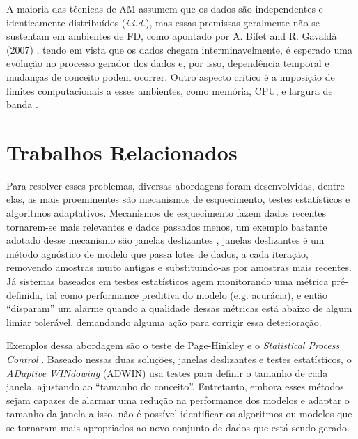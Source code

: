 A maioria das técnicas de AM assumem que os dados são independentes e
identicamente distribuídos (\textit{i.i.d.}), mas essas premissas geralmente não
se sustentam em ambientes de FD, como apontado por A. Bifet and R.
Gavald\`a (2007) \cite{bifet2007learning}, tendo em vista que os dados chegam
interminavelmente, é esperado uma evolução no processo gerador dos dados e, por isso, dependência temporal e mudanças de conceito podem ocorrer.  Outro aspecto critico é a imposição de limites
computacionais a esses ambientes, como memória, CPU, e largura de banda
\cite{bifet2010moa, gama2012survey}.

\section{Trabalhos Relacionados}

Para resolver esses problemas, diversas
abordagens foram desenvolvidas, dentre elas, as mais proeminentes são
mecanismos de esquecimento, testes estatísticos e algoritmos adaptativos.
Mecanismos de esquecimento fazem dados recentes tornarem-se mais relevantes e
dados passados menos, um exemplo bastante adotado desse mecanismo são janelas deslizantes
\cite{gaber2005mining}, janelas deslizantes é um método agnóstico de modelo que passa lotes de dados, a cada iteração, removendo amostras muito antigas e substituindo-as por amostras mais recentes. Já sistemas baseados em testes estatísticos agem monitorando uma métrica
pré-definida, tal como performance preditiva do modelo (e.g. acurácia), e então ``disparam'' um
alarme quando a qualidade dessas métricas está abaixo de algum limiar
tolerável, demandando alguma ação para corrigir essa deterioração.

Exemplos dessa abordagem são o teste de Page-Hinkley e o \textit{Statistical
Process Control} \cite{gama2010knowledge}.
Baseado nessas duas soluções, janelas deslizantes e testes estatísticos, o \textit{ADaptive WINdowing} (ADWIN) \cite{bifet2007learning} usa testes para definir o tamanho de cada janela, ajustando ao ``tamanho do conceito''.
Entretanto, embora esses métodos sejam capazes de alarmar uma redução na performance dos modelos e adaptar o tamanho da janela a isso, não é possível identificar os algoritmos ou modelos que se tornaram mais apropriados ao novo conjunto de dados que está sendo gerado.

